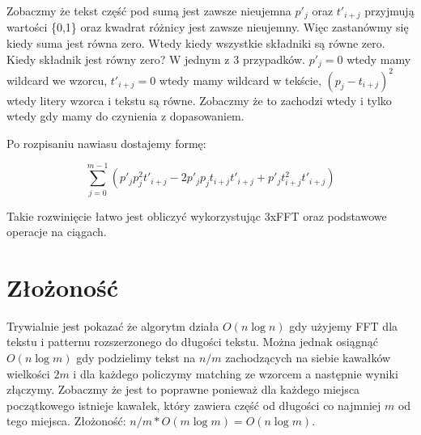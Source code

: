 \documentclass{article}
\begin{document}
Zobaczmy że tekst część pod sumą jest zawsze nieujemna $p'_{j}$ oraz $t'_{i+j}$ przyjmują wartości \{0,1\} oraz kwadrat różnicy jest zawsze nieujemny. Więc zastanówmy się kiedy suma jest równa zero. Wtedy kiedy wszystkie składniki są równe zero. Kiedy składnik jest równy zero? W jednym z 3 przypadków. $p'_{j} = 0$ wtedy mamy wildcard we wzorcu, $t'_{i+j}=0$ wtedy mamy wildcard w tekście, $(p_j - t_{i+j})^2$ wtedy litery wzorca i tekstu są równe. Zobaczmy że to zachodzi wtedy i tylko wtedy gdy mamy do czynienia z dopasowaniem.

Po rozpisaniu nawiasu dostajemy formę:

$$ \sum_{j=0}^{m-1} (p'_{j}p^2_{j}t'_{i+j} - 2 p'_{j}p_{j}t_{i+j}t'_{i+j}+p'_{j}t^2_{i+j}t'_{i+j}) $$

Takie rozwinięcie łatwo jest obliczyć wykorzystując 3xFFT oraz podstawowe operacje na ciągach.

\section*{Złożoność}

Trywialnie jest pokazać że algorytm działa $O(n \log n)$ gdy użyjemy FFT dla tekstu i patternu rozszerzonego do długości tekstu. Można jednak osiągnąć $O(n \log m)$ gdy podzielimy tekst na $n/m$ zachodzących na siebie kawałków wielkości $2m$ i dla każdego policzymy matching ze wzorcem a następnie wyniki złączymy. Zobaczmy że jest to poprawne ponieważ dla każdego miejsca początkowego istnieje kawałek, który zawiera część od długości co najmniej $m$ od tego miejsca. Złożoność: $n/m * O(m\log m)=O(n\log m)$.
\end{document}
